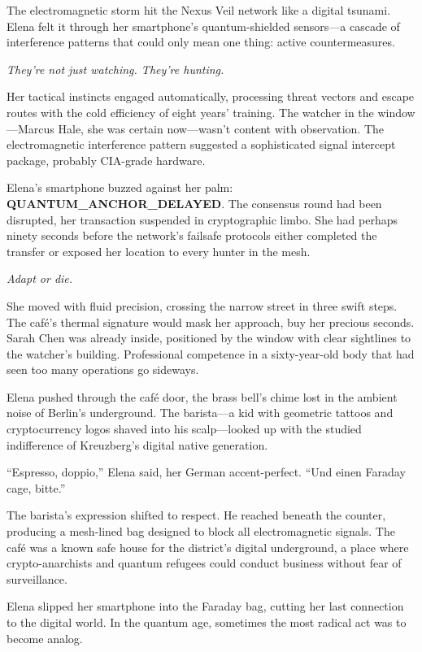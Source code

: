 \documentclass[12pt,letterpaper]{book}
\begin{document}
The electromagnetic storm hit the Nexus Veil network like a digital tsunami. Elena felt it through her smartphone's quantum-shielded sensors---a cascade of interference patterns that could only mean one thing: active countermeasures.

\emph{They're not just watching. They're hunting.}

Her tactical instincts engaged automatically, processing threat vectors and escape routes with the cold efficiency of eight years' training. The watcher in the window---Marcus Hale, she was certain now---wasn't content with observation. The electromagnetic interference pattern suggested a sophisticated signal intercept package, probably CIA-grade hardware.

Elena's smartphone buzzed against her palm: \textbf{QUANTUM\_ANCHOR\_DELAYED}. The consensus round had been disrupted, her transaction suspended in cryptographic limbo. She had perhaps ninety seconds before the network's failsafe protocols either completed the transfer or exposed her location to every hunter in the mesh.

\emph{Adapt or die.}

She moved with fluid precision, crossing the narrow street in three swift steps. The café's thermal signature would mask her approach, buy her precious seconds. Sarah Chen was already inside, positioned by the window with clear sightlines to the watcher's building. Professional competence in a sixty-year-old body that had seen too many operations go sideways.

Elena pushed through the café door, the brass bell's chime lost in the ambient noise of Berlin's underground. The barista---a kid with geometric tattoos and cryptocurrency logos shaved into his scalp---looked up with the studied indifference of Kreuzberg's digital native generation.

``Espresso, doppio,'' Elena said, her German accent-perfect. ``Und einen Faraday cage, bitte.''

The barista's expression shifted to respect. He reached beneath the counter, producing a mesh-lined bag designed to block all electromagnetic signals. The café was a known safe house for the district's digital underground, a place where crypto-anarchists and quantum refugees could conduct business without fear of surveillance.

Elena slipped her smartphone into the Faraday bag, cutting her last connection to the digital world. In the quantum age, sometimes the most radical act was to become analog.
\end{document}
